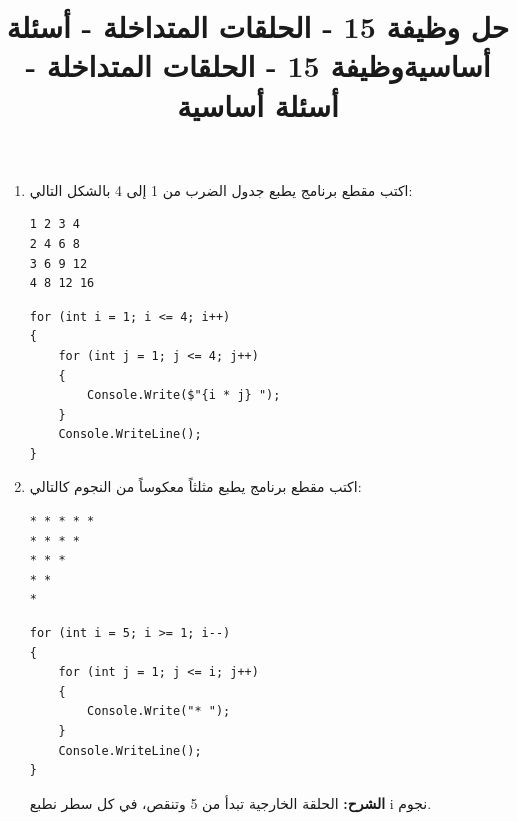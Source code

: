 \documentclass[14pt]{extarticle}
\title{حل وظيفة 15 - الحلقات المتداخلة - أسئلة أساسية}
\title{وظيفة 15 - الحلقات المتداخلة - أسئلة أساسية}
\begin{document}
\maketitle
\thispagestyle{fancy}

\begin{enumerate}[itemsep=2em]
    \item
    اكتب مقطع برنامج يطبع جدول الضرب من 1 إلى 4 بالشكل التالي:
    \begin{english}
    \begin{boxCode}
\begin{verbatim}
1 2 3 4
2 4 6 8
3 6 9 12
4 8 12 16
    \end{verbatim}
\end{boxCode}
    \end{english}
    \ifwithsols
    \begin{boxSolution}
    \begin{english}
    \begin{verbatim}
for (int i = 1; i <= 4; i++)
{
    for (int j = 1; j <= 4; j++)
    {
        Console.Write($"{i * j} ");
    }
    Console.WriteLine();
}
    \end{verbatim}
    \end{english}
    \end{boxSolution}
    \clearpage
    \fi

    \item
    اكتب مقطع برنامج يطبع مثلثاً معكوساً من النجوم كالتالي:
    \begin{english}
    \begin{boxCode}
\begin{verbatim}
* * * * *
* * * *
* * *
* *
*
    \end{verbatim}
\end{boxCode}
    \end{english}
    \ifwithsols
    \begin{boxSolution}
    \begin{english}
    \begin{verbatim}
for (int i = 5; i >= 1; i--)
{
    for (int j = 1; j <= i; j++)
    {
        Console.Write("* ");
    }
    Console.WriteLine();
}
    \end{verbatim}
    \end{english}
    \textbf{الشرح:} الحلقة الخارجية تبدأ من 5 وتنقص، في كل سطر نطبع \textenglish{i} نجوم.
    \end{boxSolution}
    \clearpage
    \fi


\end{enumerate}
\end{document}
